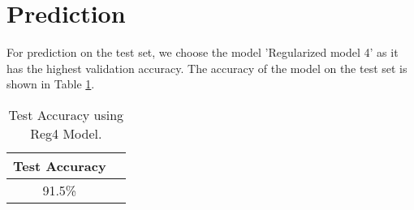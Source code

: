 \section{Prediction}
For prediction on the test set, we choose the model 'Regularized model 4' as it has the highest validation accuracy.
The accuracy of the model on the test set is shown in Table \ref{tab:prediction}.

\begin{table}[H]
    \centering
    \begin{tabular}{|c|c|}
        \hline
        \textbf{Test Accuracy} \\ \hline
        91.5\% \\ \hline
    \end{tabular}
    \caption{Test Accuracy using Reg4 Model.}
    \label{tab:prediction}
\end{table}